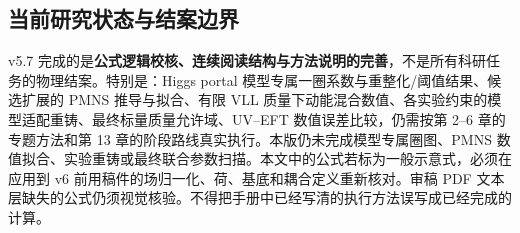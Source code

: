 \documentclass[
]{article}
\begin{document}
\subsection{当前研究状态与结案边界}\label{ux5f53ux524dux7814ux7a76ux72b6ux6001ux4e0eux7ed3ux6848ux8fb9ux754c}

v5.7
完成的是\textbf{公式逻辑校核、连续阅读结构与方法说明的完善}，不是所有科研任务的物理结案。特别是：Higgs
portal 模型专属一圈系数与重整化/阈值结果、候选扩展的 PMNS
推导与拟合、有限 VLL
质量下动能混合数值、各实验约束的模型适配重铸、最终标量质量允许域、UV--EFT
数值误差比较，仍需按第 2--6 章的专题方法和第 13
章的阶段路线真实执行。本版仍未完成模型专属圈图、PMNS
数值拟合、实验重铸或最终联合参数扫描。本文中的公式若标为一般示意式，必须在应用到
v6 前用稿件的场归一化、荷、基底和耦合定义重新核对。审稿 PDF
文本层缺失的公式仍须视觉核验。不得把手册中已经写清的执行方法误写成已经完成的计算。
\end{document}
